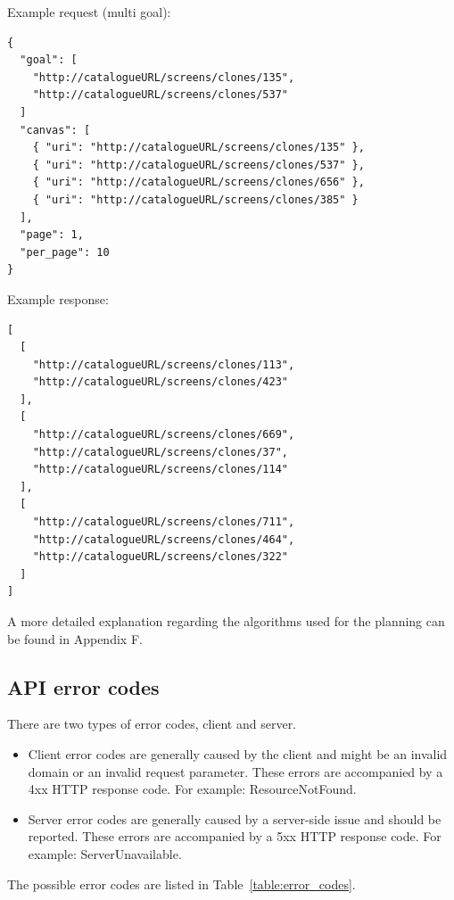 \documentclass{fast_latex}
\begin{document}
Example request (multi goal):

\singlespacing
\begin{verbatim}
{
  "goal": [
    "http://catalogueURL/screens/clones/135",
    "http://catalogueURL/screens/clones/537"
  ]
  "canvas": [
    { "uri": "http://catalogueURL/screens/clones/135" },
    { "uri": "http://catalogueURL/screens/clones/537" },
    { "uri": "http://catalogueURL/screens/clones/656" },
    { "uri": "http://catalogueURL/screens/clones/385" }
  ],
  "page": 1,
  "per_page": 10 
}
\end{verbatim}
\doublespacing

Example response:

\singlespacing
\begin{verbatim}
[
  [
    "http://catalogueURL/screens/clones/113",
    "http://catalogueURL/screens/clones/423"
  ],
  [
    "http://catalogueURL/screens/clones/669",
    "http://catalogueURL/screens/clones/37",
    "http://catalogueURL/screens/clones/114"
  ],
  [
    "http://catalogueURL/screens/clones/711",
    "http://catalogueURL/screens/clones/464",
    "http://catalogueURL/screens/clones/322"
  ]
]
\end{verbatim}
\doublespacing

A more detailed explanation regarding the algorithms used for the planning can be found in Appendix F.



\subsection{API error codes} %
There are two types of error codes, client and server.
\begin{itemize}
	\item Client error codes are generally caused by the client and might be an invalid domain or an invalid request parameter. These errors are accompanied by a 4xx HTTP response code. For example: ResourceNotFound.
	\item Server error codes are generally caused by a server-side issue and should be reported. These errors are accompanied by a 5xx HTTP response code. For example: ServerUnavailable.
\end{itemize}

The possible error codes are listed in Table~\ref{table:error_codes}.
\end{document}
